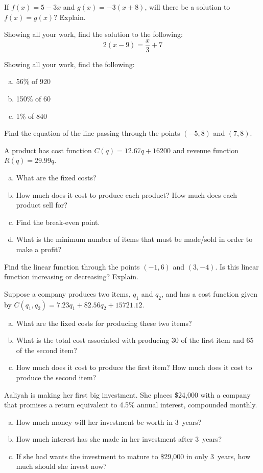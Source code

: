 \documentclass[11pt,letterpaper]{article}
\begin{document}
\prob If $f(x)= 5 - 3x$ and $g(x)= -3(x + 8)$, will there be a solution to $f(x)= g(x)$? Explain. \pspace 


\prob Showing all your work, find the solution to the following:
	\[
	2(x - 9)= \frac{x}{3} + 7
	\] \pspace


\prob Showing all your work, find the following:
	\begin{enumerate}[(a)]
	\item 56\% of 920
	\item 150\% of 60
	\item 1\% of 840
	\end{enumerate} \pspace

\prob Find the equation of the line passing through the points $(-5, 8)$ and $(7, 8)$. \pspace 


\prob A product has cost function $C(q)= 12.67q + 16200$ and revenue function $R(q)= 29.99q$. 
	\begin{enumerate}[(a)]
	\item What are the fixed costs? 
	\item How much does it cost to produce each product? How much does each product sell for?
	\item Find the break-even point.
	\item What is the minimum number of items that must be made/sold in order to make a profit?
	\end{enumerate} \pspace


\prob Find the linear function through the points $(-1, 6)$ and $(3, -4)$. Is this linear function increasing or decreasing? Explain. \pspace 


\prob Suppose a company produces two items, $q_1$ and $q_2$, and has a cost function given by $C(q_1, q_2)= 7.23 q_1 + 82.56 q_2 + 15721.12$. 
	\begin{enumerate}[(a)]
	\item What are the fixed costs for producing these two items?
	\item What is the total cost associated with producing 30 of the first item and 65 of the second item?
	\item How much does it cost to produce the first item? How much does it cost to produce the second item?
	\end{enumerate} \pspace


\prob Aaliyah is making her first big investment. She places \$24,000 with a company that promises a return equivalent to 4.5\% annual interest, compounded monthly.
	\begin{enumerate}[(a)]
	\item How much money will her investment be worth in 3~years?
	\item How much interest has she made in her investment after 3~years?
	\item If she had wants the investment to mature to \$29,000 in only 3~years, how much should she invest now?
	\end{enumerate} \pspace
\end{document}
